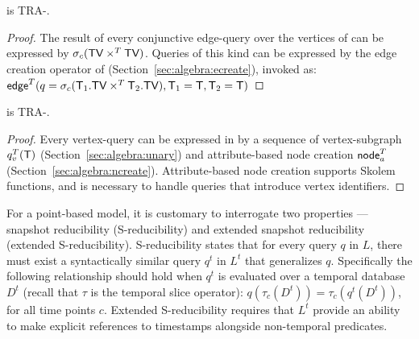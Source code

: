 \begin{theorem}
\tga is TRA-\edgec.
\label{th:edgecomplete}
\end{theorem}

\begin{proof}
  The result of every conjunctive edge-query over the vertices of \ttt
  can be expressed by $\sigma_{c} (\textsf{TV} \times^T \textsf{TV})$.  Queries of
  this kind can be expressed by the edge creation operator of \tga
  (Section~\ref{sec:algebra:ecreate}), invoked as:\\
  $\textsf{edge}^T(q=\sigma_{c} (\mathsf{T}_1.\textsf{TV} \times^T \mathsf{T}_2.\textsf{TV}),\mathsf{T}_1
  = \mathsf{T},\mathsf{T}_2=\mathsf{T})$\end{proof}



\begin{theorem}
\tga is TRA-\vertexc.
\label{th:vertexcomplete}
\end{theorem}

\begin{proof}
  Every \tra vertex-query can be expressed in \tga
  by a sequence of vertex-subgraph $q^T_v(\mathsf{T})$
  (Section~\ref{sec:algebra:unary}) and attribute-based node creation
  $\textsf{node}^T_a$ (Section~\ref{sec:algebra:ncreate}).
  Attribute-based node creation supports Skolem functions, and is
  necessary to handle queries that introduce vertex identifiers.  
\end{proof}


For a point-based model, it is customary to interrogate two
properties --- snapshot reducibility (S-reducibility) and extended
snapshot reducibility (extended S-reducibility).
%
S-reducibility states that for every query $q$ in $L$, there must
exist a syntactically similar query $q^t$ in $L^t$ that generalizes
$q$.  Specifically the following relationship should hold when $q^t$
is evaluated over a temporal database $D^t$ (recall that $\tau$ is the
temporal slice operator): $q(\tau_c(D^t)) = \tau_c(q^t(D^t))$, for all
time points $c$.  Extended S-reducibility requires that $L^t$ provide
an ability to make explicit references to timestamps alongside
non-temporal predicates.

